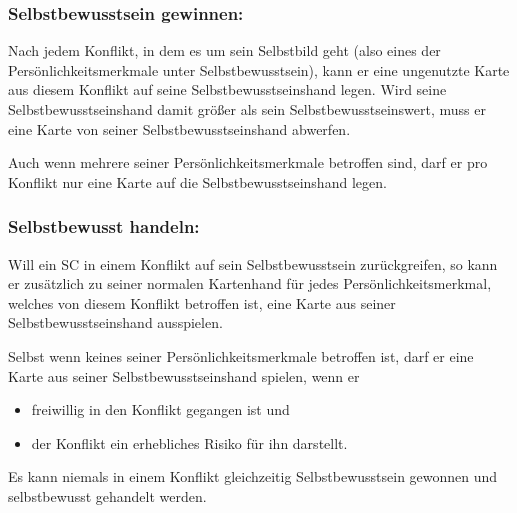 \subsubsection{Selbstbewusstsein gewinnen:}
Nach jedem Konflikt, in dem es um sein Selbstbild geht (also eines der Persönlichkeitsmerkmale unter Selbstbewusstsein), kann er eine ungenutzte Karte aus diesem Konflikt auf seine Selbstbewusstseinshand legen. Wird seine Selbstbewusstseinshand damit größer als sein Selbstbewusstseinswert, muss er eine Karte von seiner Selbstbewusstseinshand abwerfen.

Auch wenn mehrere seiner Persönlichkeitsmerkmale betroffen sind, darf er pro Konflikt nur eine Karte auf die Selbstbewusstseinshand legen.

\subsubsection{Selbstbewusst handeln:}
Will ein SC in einem Konflikt auf sein Selbstbewusstsein zurückgreifen, so kann er zusätzlich zu seiner normalen Kartenhand für jedes Persönlichkeitsmerkmal, welches von diesem Konflikt betroffen ist, eine Karte aus seiner Selbstbewusstseinshand ausspielen.

Selbst wenn keines seiner Persönlichkeitsmerkmale betroffen ist, darf er eine Karte aus seiner Selbstbewusstseinshand spielen, wenn er
\begin{itemize}
\item freiwillig in den Konflikt gegangen ist und
\item der Konflikt ein erhebliches Risiko für ihn darstellt.
\end{itemize}
Es kann niemals in einem Konflikt gleichzeitig Selbstbewusstsein gewonnen und selbstbewusst gehandelt werden.
